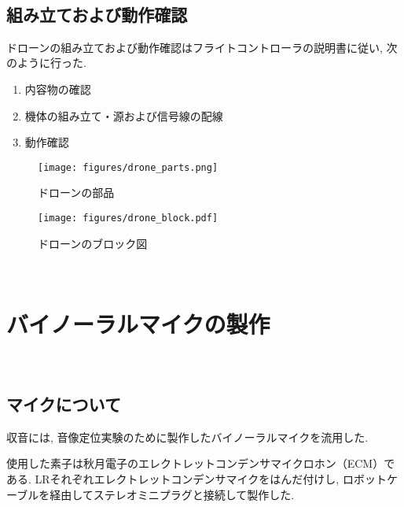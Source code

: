 \
\subsection{組み立ておよび動作確認}\label{assembly-drone}

ドローンの組み立ておよび動作確認はフライトコントローラの説明書\cite{quadrino_nano_instruction:online}に従い, 次のように行った. 

\begin{enumerate}
\renewcommand{\labelenumi}{(\arabic{enumi})}
\item
  内容物の確認
\item
  機体の組み立て・源および信号線の配線
\item
  動作確認
\end{enumerate}

\begin{figure}[H]
\centering
\texttt{[image: figures/drone\_parts.png]}
\caption{ドローンの部品}
\label{fig:drone_parts}
\end{figure}

\begin{figure}[H]
\centering
\texttt{[image: figures/drone\_block.pdf]}
\caption{ドローンのブロック図}
\label{fig:drone_block}
\end{figure}

\
\section{バイノーラルマイクの製作}\label{binaural-mic}

\
\subsection{マイクについて}\label{about-mic}

収音には, 音像定位実験のために製作したバイノーラルマイクを流用した. 

使用した素子は秋月電子のエレクトレットコンデンサマイクロホン（ECM）である. LRそれぞれエレクトレットコンデンサマイクをはんだ付けし, ロボットケーブルを経由してステレオミニプラグと接続して製作した. 


